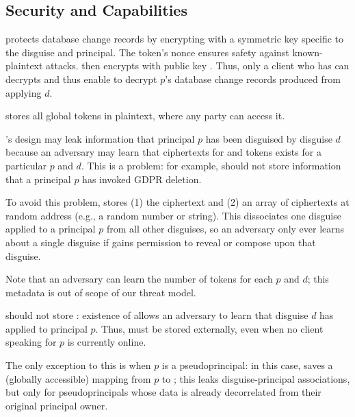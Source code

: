 \subsection{Security and Capabilities}
\sys protects database change records  by encrypting  with a symmetric key 
specific to the disguise and principal. The token's nonce ensures safety against known-plaintext
attacks. \sys then encrypts  with public key .  
%
Thus, only a client who has  can decrypts  and thus enable \sys
to decrypt $p$'s database change records produced from applying $d$.

\sys stores all global  tokens in plaintext, where any party can access it.

\sys's design may leak information that principal $p$ has been disguised by disguise
$d$ because an adversary may learn that ciphertexts for  and  tokens exists for a particular $p$ and $d$.
This is a problem: for example, \sys should not store information that a principal $p$ has
invoked GDPR deletion.

To avoid this problem, \sys stores (1) the  ciphertext and (2) an array of 
ciphertexts at random address  (e.g., a random number or string).
This dissociates one disguise applied to a principal $p$ from all other disguises, so an adversary only ever
learns about a single disguise if \sys gains permission to reveal or compose upon that disguise.

Note that an adversary can learn the number of  tokens for each $p$ and $d$; this
metadata is out of scope of our threat model.

\sys should not store : existence of  allows an adversary to
learn that disguise $d$ has applied to principal $p$. Thus,  must be stored externally,
even when no client speaking for $p$ is currently online.

The only exception to this is when $p$ is a pseudoprincipal: in this case, \sys saves a (globally
accessible) mapping from $p$ to ; this leaks disguise-principal associations, but only for pseudoprincipals whose data is already decorrelated from their original principal owner.

